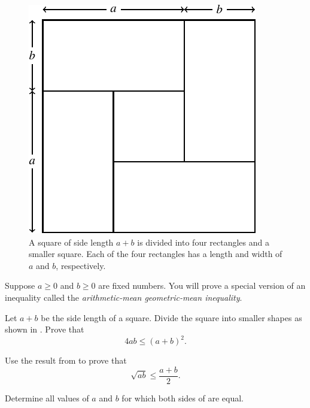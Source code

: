 \documentclass[a4paper,oneside,12pt]{article}
\begin{document}
\begin{problem}
\begin{figure}[!htbp]
\centering
\includegraphics[scale=1]{image/08/arithmetic-geometric-inequality.pdf}
\caption{%
  A square of side length $a + b$ is divided into four rectangles and
  a smaller square.  Each of the four rectangles has a length and
  width of $a$ and $b$, respectively.
}
\label{fig:arithmetic_mean_geometric_mean_inequality}
\end{figure}

\item Suppose $a \geq 0$ and $b \geq 0$ are fixed numbers.  You will
  prove a special version of an inequality called the
  \emph{arithmetic-mean geometric-mean inequality}.
  \begin{packedenum}
  \item\label{subprob:AMGM_geometry}
    Let $a + b$ be the side length of a square.  Divide the square
    into smaller shapes as shown in
    .  Prove
    that
    \begin{equation}
    \label{eqn:AMGM_geometry}
    4ab
    \leq
    (a + b)^2.
    \end{equation}

  \item\label{subprob:AMGM_inequality}
    Use the result from  to prove that
    \begin{equation}
    \label{eqn:AMGM_inequality}
    \sqrt{ab}
    \leq
    \frac{a + b}{2}.
    \end{equation}

  \item\label{subprob:AMGM_equality}
    Determine all values of $a$ and $b$ for which both sides of
     are equal.
  \end{packedenum}
\end{problem}
\end{document}
